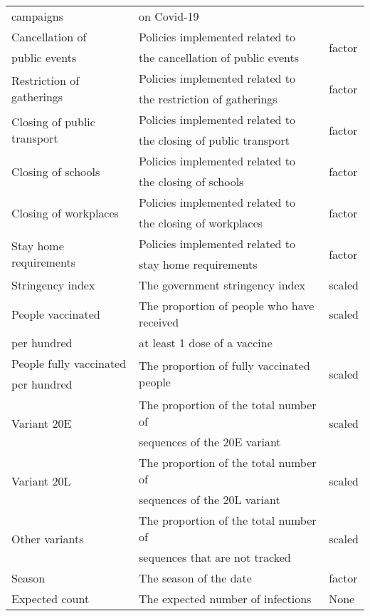 \begin{table}[H]
\begin{tabular}{l l l}
campaigns & on Covid-19 \\
Cancellation of & Policies implemented related to & \multirow{2}{*}{factor} \\
public events & the cancellation of public events \\
\multirow{2}{*}{Restriction of gatherings} & Policies implemented related to & \multirow{2}{*}{factor} \\
& the restriction of gatherings \\
\multirow{2}{*}{Closing of public transport} & Policies implemented related to & \multirow{2}{*}{factor} \\
& the closing of public transport \\
\multirow{2}{*}{Closing of schools} & Policies implemented related to& \multirow{2}{*}{factor} \\
& the closing of schools \\
\multirow{2}{*}{Closing of workplaces} & Policies implemented related to& \multirow{2}{*}{factor} \\
& the closing of workplaces \\
\multirow{2}{*}{Stay home requirements} & Policies implemented related to& \multirow{2}{*}{factor} \\
& stay home requirements \\
Stringency index & The government stringency index  & scaled \\
People vaccinated &  The proportion of people who have received   & scaled \\
per hundred  & at least 1 dose of a vaccine\\
People fully vaccinated & \multirow{2}{*}{The proportion of fully vaccinated people} &  \multirow{2}{*}{scaled} \\
per hundred \\
\multirow{2}{*}{Variant 20E} & The proportion of the total number of& \multirow{2}{*}{scaled} \\
& sequences of the 20E variant \\
\multirow{2}{*}{Variant 20L} & The proportion of the total number of& \multirow{2}{*}{scaled} \\
& sequences of the 20L variant \\
\multirow{2}{*}{Other variants} & The proportion of the total number of& \multirow{2}{*}{scaled} \\
& sequences that are not tracked \\
Season & The season of the date & factor \\
Expected count & The expected number of infections & None \\
\bottomrule
\end{tabular}
\end{table}